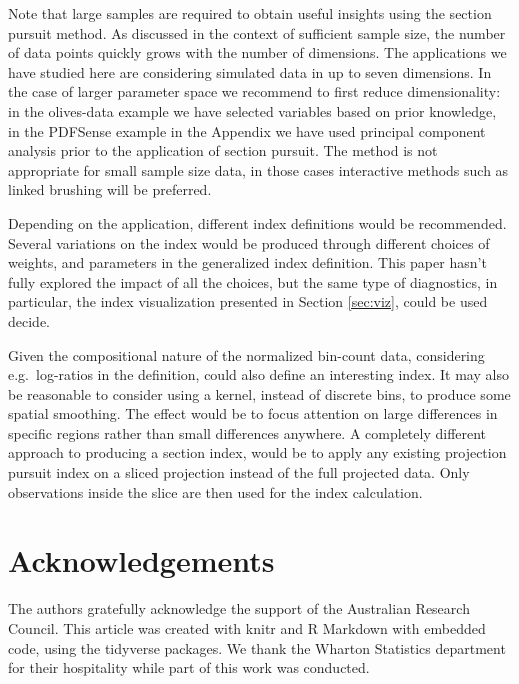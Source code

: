 \documentclass[]{interact}
\theoremstyle{plain}%
\theoremstyle{definition}
\theoremstyle{remark}
\begin{document}
Note that large samples are required to obtain useful insights using the
section pursuit method. As discussed in the context of sufficient sample
size, the number of data points quickly grows with the number of
dimensions. The applications we have studied here are considering
simulated data in up to seven dimensions. In the case of larger
parameter space we recommend to first reduce dimensionality: in the
olives-data example we have selected variables based on prior knowledge,
in the PDFSense example in the Appendix we have used principal component
analysis prior to the application of section pursuit. The method is not
appropriate for small sample size data, in those cases interactive
methods such as linked brushing will be preferred.

Depending on the application, different index definitions would be
recommended. Several variations on the index would be produced through
different choices of weights, and parameters in the generalized index
definition. This paper hasn't fully explored the impact of all the
choices, but the same type of diagnostics, in particular, the index
visualization presented in Section \ref{sec:viz}, could be used decide.

Given the compositional nature of the normalized bin-count data,
considering e.g.~log-ratios in the definition, could also define an
interesting index. It may also be reasonable to consider using a kernel,
instead of discrete bins, to produce some spatial smoothing. The effect
would be to focus attention on large differences in specific regions
rather than small differences anywhere. A completely different approach
to producing a section index, would be to apply any existing projection
pursuit index on a sliced projection instead of the full projected data.
Only observations inside the slice are then used for the index
calculation.

\hypertarget{acknowledgements}{%
\section*{Acknowledgements}\label{acknowledgements}}

The authors gratefully acknowledge the support of the Australian
Research Council. This article was created with knitr \citep{knitr} and
R Markdown \citep{rmarkdown} with embedded code, using the tidyverse
\citep{tidyverse} packages. We thank the Wharton Statistics department
for their hospitality while part of this work was conducted.
\end{document}
